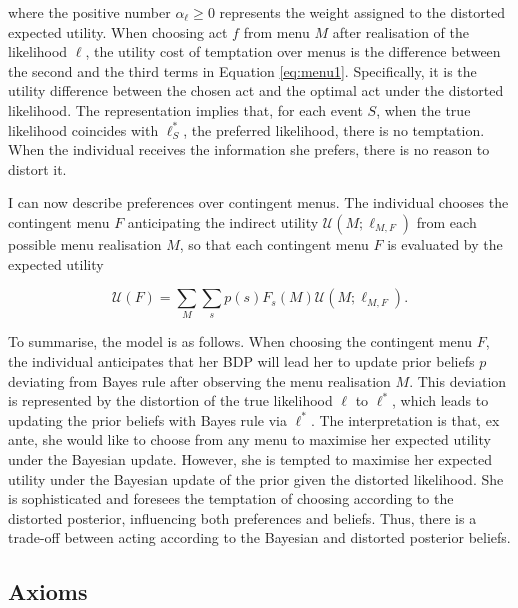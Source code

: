 where the positive number \( \alpha_{\ell} \geq 0 \) represents the weight assigned to the distorted expected utility. When choosing act \( f \) from menu \( M \) after realisation of the likelihood \( \ell \), the utility cost of temptation over menus is the difference between the second and the third terms in Equation \eqref{eq:menu1}. Specifically, it is the utility difference between the chosen act and the optimal act under the distorted likelihood. The representation implies that, for each event \( S \), when the true likelihood coincides with \( \ell^{*}_{S} \), the preferred likelihood, there is no temptation. When the individual receives the information she prefers, there is no reason to distort it.

I can now describe preferences over contingent menus. The individual chooses the contingent menu \( F \) anticipating the indirect utility \( \mathcal{U} \left(M ; \ell_{M, F} \right) \) from each possible menu realisation \( M \), so that each contingent menu \(F\) is evaluated by the expected utility

\begin{equation}\label{eq:contmenu1}
	\mathscr{U}(F)= \sum_{M} \sum_{s} p \left( s \right) F_{s} \left( M \right) \mathcal{U} \left(M ; \ell_{M, F} \right).
\end{equation}

To summarise, the model is as follows. When choosing the contingent menu \( F \), the individual anticipates that her BDP will lead her to update prior beliefs \( p \) deviating from Bayes rule after observing the menu realisation \( M \). This deviation is represented by the distortion of the true likelihood \( \ell \) to \( \ell^{*} \), which leads to updating the prior beliefs with Bayes rule via \( \ell^{*} \). The interpretation is that, ex ante, she would like to choose from any menu to maximise her expected utility under the Bayesian update. However, she is tempted to maximise her expected utility under the Bayesian update of the prior given the distorted likelihood. She is sophisticated and foresees the temptation of choosing according to the distorted posterior, influencing both preferences and beliefs. Thus, there is a trade-off between acting according to the Bayesian and distorted posterior beliefs.

\subsection{Axioms}\label{sec:axioms}

